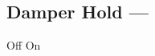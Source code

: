 \subsection[Damper Hold]{Damper Hold --- \UiKey{\SET}}









































Off
On
